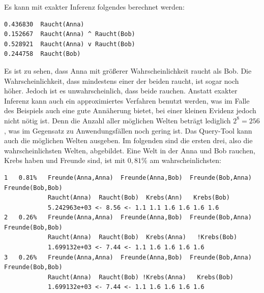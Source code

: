 Es kann mit exakter Inferenz folgendes berechnet werden: 
\begin{lstlisting}[backgroundcolor=\color{backcolour}]
0.436830  Raucht(Anna)
0.152667  Raucht(Anna) ^ Raucht(Bob)
0.528921  Raucht(Anna) v Raucht(Bob)
0.244758  Raucht(Bob)
\end{lstlisting} 
Es ist zu sehen, dass Anna mit größerer Wahrscheinlichkeit raucht als Bob. Die Wahrscheinlichkeit, dass mindestens einer der beiden raucht, ist sogar noch höher. Jedoch ist es unwahrscheinlich, dass beide rauchen. \newline
Anstatt exakter Inferenz kann auch ein approximiertes Verfahren benutzt werden, was im Falle des Beispiels auch eine gute Annäherung bietet, bei einer kleinen Evidenz jedoch nicht nötig ist. Denn die Anzahl aller möglichen Welten beträgt lediglich $2^8 = 256$, was im Gegensatz zu Anwendungsfällen noch gering ist. Das Query-Tool kann auch die möglichen Welten ausgeben. Im folgenden sind die ersten drei, also die wahrscheinlichsten Welten, abgebildet. Eine Welt in der Anna und Bob rauchen, Krebs haben und Freunde sind, ist mit $0,81\%$ am wahrscheinlichsten:
\begin{lstlisting}[backgroundcolor=\color{backcolour}]
1   0.81%   Freunde(Anna,Anna)  Freunde(Anna,Bob)  Freunde(Bob,Anna)  Freunde(Bob,Bob)
            Raucht(Anna)  Raucht(Bob)  Krebs(Ann)   Krebs(Bob)
            5.242963e+03 <- 8.56 <- 1.1 1.1 1.6 1.6 1.6 1.6
2   0.26%   Freunde(Anna,Anna)  Freunde(Anna,Bob)  Freunde(Bob,Anna)  Freunde(Bob,Bob)
            Raucht(Anna)  Raucht(Bob)  Krebs(Anna)   !Krebs(Bob)
            1.699132e+03 <- 7.44 <- 1.1 1.6 1.6 1.6 1.6
3   0.26%   Freunde(Anna,Anna)  Freunde(Anna,Bob)  Freunde(Bob,Anna)  Freunde(Bob,Bob)
            Raucht(Anna)  Raucht(Bob) !Krebs(Anna)   Krebs(Bob)
            1.699132e+03 <- 7.44 <- 1.1 1.6 1.6 1.6 1.6
\end{lstlisting}  
